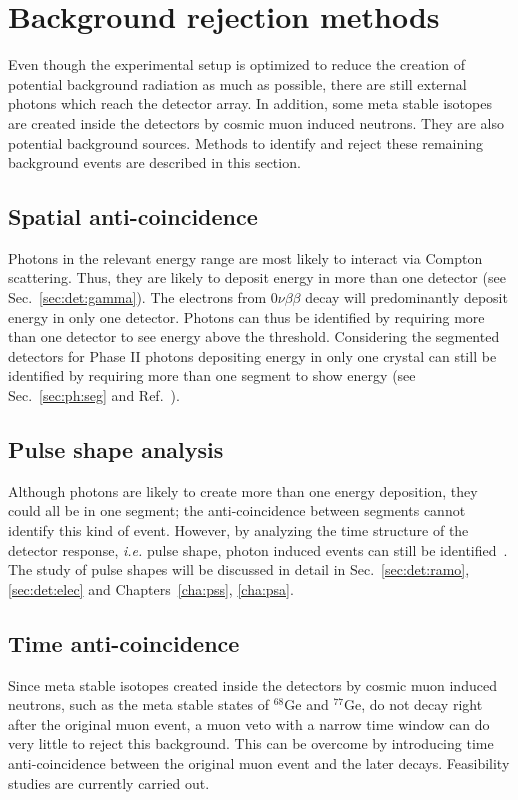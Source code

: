 \section{Background rejection methods}
\label{sec:gerda:anti}
Even though the experimental setup is optimized to reduce the creation
of potential background radiation as much as possible, there are still
external photons which reach the detector array. In addition, some
meta stable isotopes are created inside the detectors by cosmic muon
induced neutrons. They are also potential background sources. Methods
to identify and reject these remaining background events are described
in this section.

\subsection{Spatial anti-coincidence} 
\label{sec:gerda:santi}
Photons in the relevant energy range are most likely to interact via
Compton scattering. Thus, they are likely to deposit energy in more
than one detector (see Sec.~\ref{sec:det:gamma}). The electrons from
$0\nu\beta\beta$ decay will predominantly deposit energy in only one
detector. Photons can thus be identified by requiring more than one
detector to see energy above the threshold. Considering the segmented
detectors for Phase II photons depositing energy in only one crystal
can still be identified by requiring more than one segment to show
energy (see Sec.~\ref{sec:ph:seg} and Ref.~\cite{Sipid}).

\subsection{Pulse shape analysis}
\label{sec:gerda:psa}
Although photons are likely to create more than one energy deposition,
they could all be in one segment; the anti-coincidence between
segments cannot identify this kind of event. However, by analyzing the
time structure of the detector response, \textit{i.e.} pulse shape,
photon induced events can still be identified~\cite{Kev07}. The study
of pulse shapes will be discussed in detail in
Sec.~\ref{sec:det:ramo}, \ref{sec:det:elec} and
Chapters~\ref{cha:pss}, \ref{cha:psa}.

\subsection{Time anti-coincidence} 
\label{sec:gerda:tanti}
Since meta stable isotopes created inside the detectors by cosmic muon
induced neutrons, such as the meta stable states of $^{68}$Ge and
$^{77}$Ge, do not decay right after the original muon event, a muon
veto with a narrow time window can do very little to reject this
background. This can be overcome by introducing time anti-coincidence
between the original muon event and the later decays. Feasibility
studies are currently carried out.

